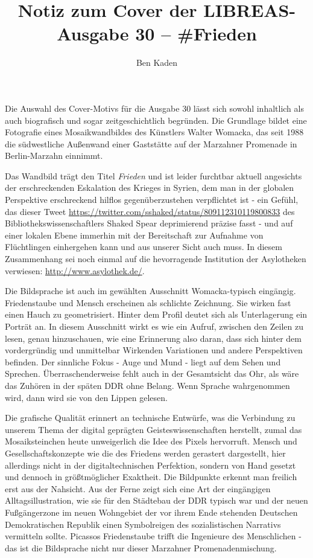 \documentclass[a4paper,
fontsize=11pt,
oneside,
numbers=noperiodatend,
parskip=half-,
bibliography=totoc,
final
]{scrartcl}
\title{\LARGE{Notiz zum Cover der LIBREAS-Ausgabe 30 -- \#Frieden}
} %
\author{Ben Kaden} %
\date{}
\begin{document}
\maketitle
\thispagestyle{fancyplain} 


Die Auswahl des Cover-Motivs für die Ausgabe 30 lässt sich sowohl
inhaltlich als auch biografisch und sogar zeitgeschichtlich begründen.
Die Grundlage bildet eine Fotografie eines Mosaikwandbildes des
Künstlers Walter Womacka, das seit 1988 die südwestliche Außenwand einer
Gaststätte auf der Marzahner Promenade in Berlin-Marzahn einnimmt.

Das Wandbild trägt den Titel \emph{Frieden} und ist leider furchtbar
aktuell angesichts der erschreckenden Eskalation des Krieges in Syrien,
dem man in der globalen Perspektive erschreckend hilflos
gegenüberzustehen verpflichtet ist - ein Gefühl, das dieser Tweet
\url{https://twitter.com/sshaked/status/809112310119800833} des
Bibliothekswissenschaftlers Shaked Spear deprimierend präzise fasst -
und auf einer lokalen Ebene immerhin mit der Bereitschaft zur Aufnahme
von Flüchtlingen einhergehen kann und aus unserer Sicht auch muss. In
diesem Zusammenhang sei noch einmal auf die hevorragende Institution der
Asylotheken verwiesen: \url{http://www.asylothek.de/}.

Die Bildsprache ist auch im gewählten Ausschnitt Womacka-typisch
eingängig. Friedenstaube und Mensch erscheinen als schlichte Zeichnung.
Sie wirken fast einen Hauch zu geometrisiert. Hinter dem Profil deutet
sich als Unterlagerung ein Porträt an. In diesem Ausschnitt wirkt es wie
ein Aufruf, zwischen den Zeilen zu lesen, genau hinzuschauen, wie eine
Erinnerung also daran, dass sich hinter dem vordergründig und
unmittelbar Wirkenden Variationen und andere Perspektiven befinden. Der
sinnliche Fokus - Auge und Mund - liegt auf dem Sehen und Sprechen.
Überraschenderweise fehlt auch in der Gesamtsicht das Ohr, als wäre das
Zuhören in der späten DDR ohne Belang. Wenn Sprache wahrgenommen wird,
dann wird sie von den Lippen gelesen.

Die grafische Qualität erinnert an technische Entwürfe, was die
Verbindung zu unserem Thema der digital geprägten Geisteswissenschaften
herstellt, zumal das Mosaiksteinchen heute unweigerlich die Idee des
Pixels hervorruft. Mensch und Gesellschaftskonzepte wie die des Friedens
werden gerastert dargestellt, hier allerdings nicht in der
digitaltechnischen Perfektion, sondern von Hand gesetzt und dennoch in
größtmöglicher Exaktheit. Die Bildpunkte erkennt man freilich erst aus
der Nahsicht. Aus der Ferne zeigt sich eine Art der eingängigen
Alltagsillustration, wie sie für den Städtebau der DDR typisch war und
der neuen Fußgängerzone im neuen Wohngebiet der vor ihrem Ende stehenden
Deutschen Demokratischen Republik einen Symbolreigen des sozialistischen
Narrativs vermitteln sollte. Picassos Friedenstaube trifft die
Ingenieure des Menschlichen - das ist die Bildsprache nicht nur dieser
Marzahner Promenadenmischung.
\end{document}
